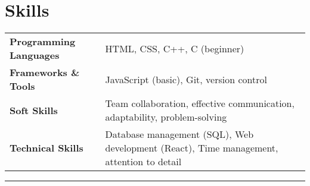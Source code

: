 \documentclass[a4paper,12pt]{article}
\begin{document}
\section{Skills}
\begin{tabularx}{\linewidth}{@{}l X@{}}
\textbf{Programming Languages} & \normalsize{HTML, CSS, C++, C (beginner)} \\

\textbf{Frameworks \& Tools} & \normalsize{JavaScript (basic), Git, version control} \\

\textbf{Soft Skills} & \normalsize{Team collaboration, effective communication, adaptability, problem-solving} \\

\textbf{Technical Skills} & \normalsize{Database management (SQL), Web development (React), Time management, attention to detail} \\ 
\end{tabularx}
\noindent\rule{\linewidth}{0.5pt} %

\vfill
{}
\end{document}
